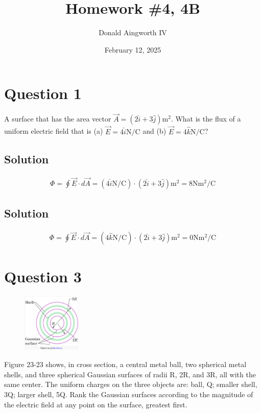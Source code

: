 \documentclass[12pt]{article}
\title{Homework \#4, 4B}
\author{Donald Aingworth IV}
\date{February 12, 2025}
\begin{document}

\maketitle

\section{Question 1}
A surface that has the area vector $\vec{A} = \left(2\hat{i} + 3\hat{j}\right) \unit{\meter^2}$. What is the flux of a uniform electric field that is (a) $\vec{E} = 4\hat{i} \unit{\newton/\coulomb}$ and (b) $\vec{E} = 4\hat{k} \unit{\newton/\coulomb}$?

\subsection{Solution}
\begin{gather*}
    \Phi = \oint \vec{E} \cdot d\vec{A}
        =   \left(4\hat{i} \unit{\newton/\coulomb}\right) \cdot \left(2\hat{i} + 3\hat{j}\right) \unit{\meter^2}
        =   \boxed{8 \unit{\newton\meter^2/\coulomb}}
\end{gather*}

\subsection{Solution}
\begin{gather*}
    \Phi = \oint \vec{E} \cdot d\vec{A}
        =   \left(4\hat{k} \unit{\newton/\coulomb}\right) \cdot \left(2\hat{i} + 3\hat{j}\right) \unit{\meter^2}
        =   \boxed{0 \unit{\newton\meter^2/\coulomb}}
\end{gather*}

\pagebreak
\section{Question 3}
\begin{figure}
    \vspace{-30pt}
    \includegraphics[width=0.25\textwidth]{picture_2.png} 
\end{figure}
Figure 23-23 shows, in cross section, a central metal ball, two spherical metal shells, and three spherical Gaussian surfaces of radii R, 2R, and 3R, all with the same center. The uniform charges on the three objects are: ball, Q; smaller shell, 3Q; larger shell, 5Q. Rank the Gaussian surfaces according to the magnitude of the electric field at any point on the surface, greatest first.
\end{document}

